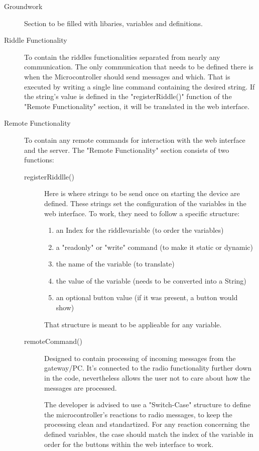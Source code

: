 \begin{description}
	\item [Groundwork]
	Section to be filled with libaries, variables and definitions. 
	\item [Riddle Functionality]
	To contain the riddles functionalities separated from nearly any communication. 
	The only communication that needs to be defined there is when the Microcontroller should send messages and which. 
	That is executed by writing a single line command containing the desired string.
	If the string's value is defined in the "registerRiddle()" function of the "Remote Functionality" section, it will be translated in the web interface. 
	
	\item [Remote Functionality]
	To contain any remote commands for interaction with the web interface and the server.
	The "Remote Functionality" section consists of two functions: 
	\begin{description}
		\item [registerRiddlle()]
		Here is where strings to be send once on starting the device are defined. 
		These strings set the configuration of the variables in the web interface.
		To work, they need to follow a specific structure:
		\begin{enumerate}
			\item an Index for the riddlevariable (to order the variables)
			\item a "readonly" or "write" command (to make it static or dynamic)
			\item the name of the variable (to translate)
			\item the value of the variable (needs to be converted into a String)
			\item an optional button value (if it was present, a button would show)
		\end{enumerate}
		That structure is meant to be applieable for any variable. 
		\item[remoteCommand()]
		Designed to contain processing of incoming messages from the gateway/PC.
		It's connected to the radio functionality further down in the code, nevertheless allows the user not to care about how the messages are processed.
		
		The developer is advised to use a "Switch-Case" structure to define the microcontroller's reactions to radio messages, to keep the processing clean and standartized. 
		For any reaction concerning the defined variables, the case should match the index of the variable in order for the buttons within the web interface to work.
		
	\end{description}
	
\end{description}



